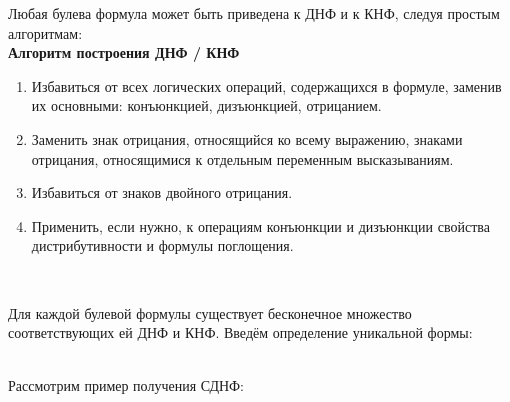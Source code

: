 Любая булева формула может быть приведена к ДНФ и к КНФ, следуя простым алгоритмам: \\

\textbf{Алгоритм построения ДНФ / КНФ}
\begin{enumerate}
  \item Избавиться от всех логических операций, содержащихся в формуле, заменив их основными: конъюнкцией, дизъюнкцией, отрицанием.
  \item Заменить знак отрицания, относящийся ко всему выражению, знаками отрицания, относящимися к отдельным переменным высказываниям.
  \item Избавиться от знаков двойного отрицания.
  \item Применить, если нужно, к операциям конъюнкции и дизъюнкции свойства дистрибутивности и формулы поглощения.
\end{enumerate}
\

Для каждой булевой формулы существует бесконечное множество соответствующих ей ДНФ и КНФ. Введём определение уникальной формы: \\

\

Рассмотрим пример получения СДНФ: \\


